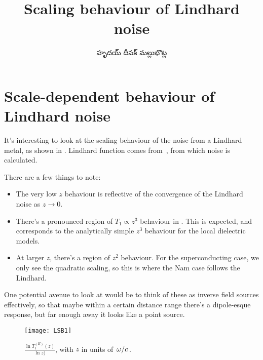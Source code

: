 \documentclass[../main.tex]{subfiles}
\title{Scaling behaviour of Lindhard noise}
\author{\begin{telugu}హృదయ్ దీపక్ మల్లుభొట్ల\end{telugu}}
\date{}
\begin{document}
	\graphicspath{{\main/figures/}}

	\onlyinsubfile{\maketitle}

	\section{Scale-dependent behaviour of Lindhard noise} \label{sec:lsb:intro}

	It's interesting to look at the scaling behaviour of the noise from a Lindhard metal, as shown in .
	Lindhard function comes from~\cite{SolyomV3}, from which noise is calculated.

	There are a few things to note:
	\begin{itemize}
		\item The very low $z$ behaviour is reflective of the convergence of the Lindhard noise as $z \rightarrow 0$.
		\item There's a pronounced region of $T_1 \propto z^3$ behaviour in .
			This is expected, and corresponds to the analytically simple $z^3$ behaviour for the local dielectric models.
		\item At larger $z$, there's a region of $z^2$ behaviour.
			For the superconducting case, we only see the quadratic scaling, so this is where the Nam case follows the Lindhard.
	\end{itemize}

	One potential avenue to look at would be to think of these as inverse field sources effectively, so that maybe within a certain distance range there's a dipole-esque response, but far enough away it looks like a point source.

	\begin{figure}[htp]
		\centering
		\texttt{[image: LSB1]}
		\caption{$\frac{\ln{T_{1}^{(E)}(z)}}{\ln{z})}$, with $z$ in units of $\flatfrac{\omega}{c}$.}\label{fig:lsb:scale1}
	\end{figure}
\end{document}
